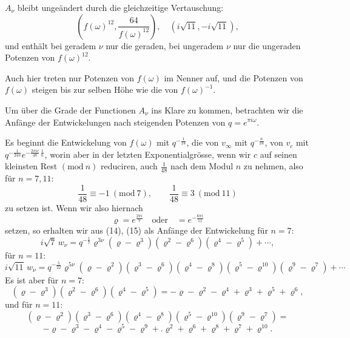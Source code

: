 
$A_\nu$ bleibt ungeändert durch die gleichzeitige Vertauschung:
\[
\left( f(\omega)^{12}, \frac{64}{f(\omega)^{12}} \right), \quad
\left( i\sqrt{11}, -i\sqrt{11} \right),
\]
und enthält bei geradem $\nu$ nur die geraden, bei ungeradem $\nu$
nur die ungeraden Potenzen von $f(\omega)^{12}$.

Auch hier treten nur Potenzen von $f(\omega)$ im Nenner auf, und die
Potenzen von $f(\omega)$ steigen bis zur selben Höhe wie die von
$f(\omega)^{-1}$.

Um über die Grade der Functionen $A_\nu$ ins Klare zu kommen,
betrachten wir die Anfänge der Entwickelungen nach steigenden
Potenzen von $q = e^{\pi i \omega}$.

Es beginnt die Entwickelung von $f(\omega)$ mit $q^{-\frac{1}{24}}$,
die von $v_\infty$ mit $q^{-\frac{n}{24}}$, von $v_c$ mit
$q^{-\frac{1}{24n}} e^{-\frac{2\pi i c}{48}\, \frac{1}{n}}$, worin
aber in der letzten Exponentialgrösse, wenn wir $c$ auf seinen
kleinsten Rest $(\mathrm{mod}\ n)$ reduciren, auch $\frac{1}{48}$
nach dem Modul $n$ zu nehmen, also für $n = 7, 11$:
\[
\frac{1}{48} \equiv -1 \ (\mathrm{mod}\ 7), \qquad
\frac{1}{48} \equiv 3 \ (\mathrm{mod}\ 11)
\]
zu setzen ist. Wenn wir also hiernach
\[
\varrho = e^{\frac{2\pi i}{7}} \quad \text{oder} \quad = e^{-\frac{6\pi i}{11}}
\]
setzen, so erhalten wir aus (14), (15) als Anfänge der Entwickelung
für $n=7$:
\[
i\sqrt{7}\, w_\nu = q^{-\frac{1}{7}} \varrho^{3\nu} (\varrho - \varrho^3)(\varrho^2 - \varrho^6)(\varrho^4 - \varrho^5) + \cdots,
\]
für $n=11$:
\[
i\sqrt{11}\, w_\nu = q^{-\frac{5}{22}} \varrho^{5\nu} (\varrho - \varrho^2)(\varrho^3 - \varrho^6)(\varrho^4 - \varrho^8)(\varrho^5 - \varrho^{10})(\varrho^9 - \varrho^7) + \cdots
\]
Es ist aber für $n = 7$:
\[
(\varrho - \varrho^3)(\varrho^2 - \varrho^6)(\varrho^4 - \varrho^5) = -\varrho - \varrho^2 - \varrho^4 + \varrho^3 + \varrho^5 + \varrho^6,
\]
und für $n = 11$:
\[
(\varrho - \varrho^2)(\varrho^3 - \varrho^6)(\varrho^4 - \varrho^8)(\varrho^5 - \varrho^{10})(\varrho^9 - \varrho^7) =
\]
\[
-\varrho - \varrho^3 - \varrho^4 - \varrho^5 - \varrho^9 +.\varrho^2 + \varrho^6 + \varrho^8 + \varrho^7 + \varrho^{10}. %
\]
